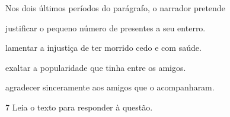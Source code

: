 Nos dois últimos períodos do parágrafo, o narrador pretende 

\begin{escolha}

    \item justificar o pequeno número de presentes a seu enterro. 

    \item lamentar a injustiça de ter morrido cedo e com saúde.

    \item exaltar a popularidade que tinha entre os amigos.

    \item agradecer sinceramente aos amigos que o acompanharam.

\end{escolha}

\num{7} Leia o texto para responder à questão. 

